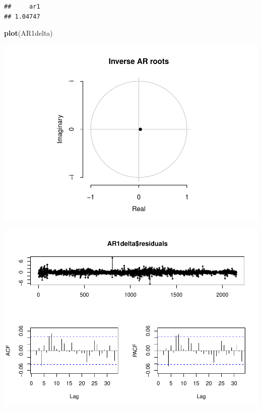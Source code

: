 \documentclass[11pt, a4paper]{report}
\newenvironment{Shaded}{\begin{snugshade}}{\end{snugshade}}
\newcommand{\KeywordTok}[1]{\textcolor[rgb]{0.13,0.29,0.53}{\textbf{#1}}}
\newcommand{\NormalTok}[1]{#1}
\newcommand{\OperatorTok}[1]{\textcolor[rgb]{0.81,0.36,0.00}{\textbf{#1}}}
\theoremstyle{plain}
\theoremstyle{plain}
\theoremstyle{remark}
\begin{document}
\begin{verbatim}
##     ar1 
## 1.04747
\end{verbatim}

\begin{Shaded}
\begin{Highlighting}[]
\KeywordTok{plot}\NormalTok{(AR1delta)}
\end{Highlighting}
\end{Shaded}

\begin{center}\includegraphics{Econo2_P1_files/figure-latex/delta 1-1} \end{center}

\begin{Shaded}
\end{Shaded}

\begin{center}\includegraphics{Econo2_P1_files/figure-latex/delta 1-2} \end{center}
\end{document}
